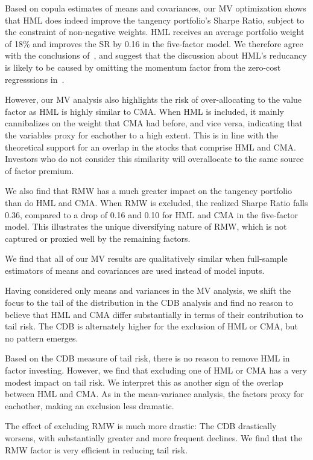 Based on copula estimates of means and covariances, our MV optimization shows that HML does indeed improve the tangency portfolio's Sharpe Ratio, subject to the constraint of non-negative weights. HML receives an average portfolio weight of 18\% and improves the SR by 0.16 in the five-factor model. We therefore agree with the conclusions of~\textcite{Asness2015}, and suggest that the discussion about HML's reducancy is likely to be caused by omitting the momentum factor from the zero-cost regresssions in~\textcite{FF2015}.

However, our MV analysis also highlights the risk of over-allocating to the value factor as HML is highly similar to CMA. When HML is included, it mainly cannibalizes on the weight that CMA had before, and vice versa, indicating that the variables proxy for eachother to a high extent. This is in line with the theoretical support for an overlap in the stocks that comprise HML and CMA. Investors who do not consider this similarity will overallocate to the same source of factor premium.

We also find that RMW has a much greater impact on the tangency portfolio than do HML and CMA. When RMW is excluded, the realized Sharpe Ratio falls 0.36, compared to a drop of 0.16 and 0.10 for HML and CMA in the five-factor model. This illustrates the unique diversifying nature of RMW, which is not captured or proxied well by the remaining factors.

We find that all of our MV results are qualitatively similar when full-sample estimators of means and covariances are used instead of model inputs.

Having considered only means and variances in the MV analysis, we shift the focus to the tail of the distribution in the CDB analysis and find no reason to believe that HML and CMA differ substantially in terms of their contribution to tail risk. The CDB is alternately higher for the exclusion of HML or CMA, but no pattern emerges. 

Based on the CDB measure of tail risk, there is no reason to remove HML in factor investing. However, we find that excluding one of HML or CMA has a very modest impact on tail risk. We interpret this as another sign of the overlap between HML and CMA. As in the mean-variance analysis, the factors proxy for eachother, making an exclusion less dramatic. 

The effect of excluding RMW is much more drastic: The CDB drastically worsens, with substantially greater and more frequent declines. We find that the RMW factor is very efficient in reducing tail risk.
 
